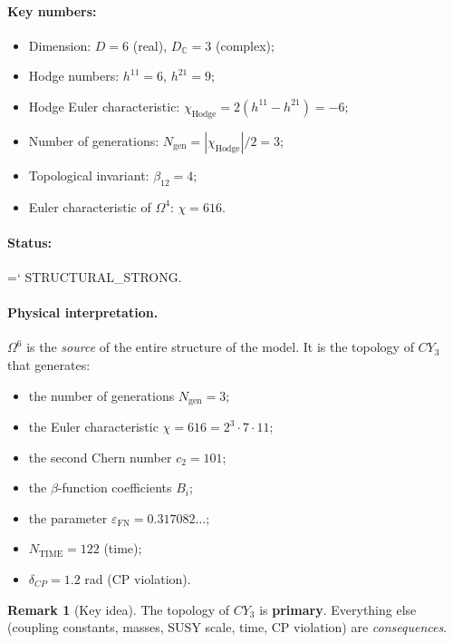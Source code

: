 \documentclass[11pt,a4paper]{article}
\newcommand{\CY}{CY_3}
\newcommand{\Om}{\Omega^4}
\newcommand{\Oms}{\Omega^6}
\newcommand{\Ngen}{N_{\text{gen}}}
\newcommand{\epsFN}{\varepsilon_{\text{FN}}}
\newcommand{\cTwo}{c_2}
\renewcommand{\texttt}[1]{{\ttfamily\hyphenchar\font=`\- #1}}
\theoremstyle{definition}
\newtheorem{remark}[theorem]{Remark}
\begin{document}
\paragraph{Key numbers:}
\begin{itemize}
    \item Dimension: $D = 6$ (real), 
          $D_{\mathbb{C}} = 3$ (complex);
    \item Hodge numbers: $h^{11} = 6$, $h^{21} = 9$;
    \item Hodge Euler characteristic: 
          $\chi_{\text{Hodge}} = 2(h^{11} - h^{21}) = -6$;
    \item Number of generations: $\Ngen = |\chi_{\text{Hodge}}|/2 = 3$;
    \item Topological invariant: $\beta_{12} = 4$;
    \item Euler characteristic of $\Om$: $\chi = 616$.
\end{itemize}

\paragraph{Status:} \texttt{STRUCTURAL\_STRONG}.

\paragraph{Physical interpretation.}
$\Oms$ is the \emph{source} of the entire structure of the model. It is 
the topology of $\CY$ that generates:
\begin{itemize}
    \item the number of generations $\Ngen = 3$;
    \item the Euler characteristic $\chi = 616 = 2^3 \cdot 7 \cdot 11$;
    \item the second Chern number $\cTwo = 101$;
    \item the $\beta$-function coefficients $B_i$;
    \item the parameter $\epsFN = 0.317082\ldots$;
    \item $N_{\text{TIME}} = 122$ (time);
    \item $\delta_{CP} = 1.2$ rad (CP violation).
\end{itemize}

\begin{remark}[Key idea]
\label{rem:cy-source}
The topology of $\CY$ is \textbf{primary}. Everything else 
(coupling constants, masses, SUSY scale, time, CP violation) 
are \emph{consequences}.
\end{remark}
\end{document}
